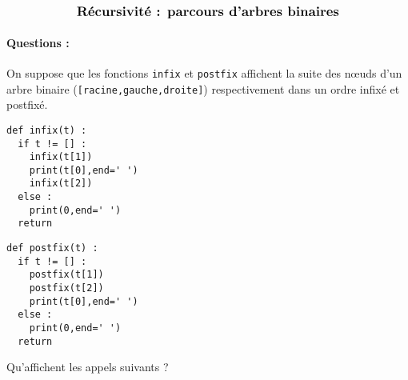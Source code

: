 \documentclass[11pt,a4paper]{article}
\begin{document}

$$\mbox{\textbf{\large Récursivité : parcours d'arbres binaires}}$$


\paragraph{Questions :}
On suppose que les fonctions \texttt{infix} et \texttt{postfix} affichent la suite des n\oe uds
d'un arbre binaire (\texttt{[racine,gauche,droite]}) respectivement dans un ordre infixé et postfixé.
\vspace*{2mm}

\noindent
\begin{minipage}[t]{7cm}
\begin{lstlisting}
def infix(t) :
  if t != [] :
    infix(t[1])
    print(t[0],end=' ')
    infix(t[2])
  else : 
    print(0,end=' ')
  return
\end{lstlisting}
\end{minipage}
\hfill
\begin{minipage}[t]{7cm}
\begin{lstlisting}
def postfix(t) :
  if t != [] :
    postfix(t[1])
    postfix(t[2])
    print(t[0],end=' ')
  else : 
    print(0,end=' ')
  return
\end{lstlisting}
\end{minipage}
\vspace*{2mm}

Qu'affichent les appels suivants ?

\end{document}
